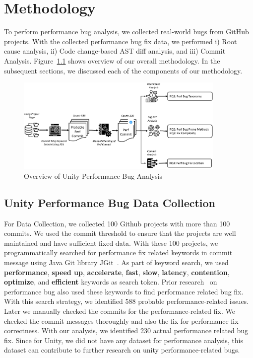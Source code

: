 \chapter{Methodology}
\label{chapter:methodology}
To perform \unity{} performance bug analysis, we collected real-world bugs from GitHub projects. With the collected performance bug fix data, we performed i) Root cause analysis, ii) Code change-based AST diff analysis, and iii) Commit Analysis. Figure~\ref{figure:overview} shows overview of our overall methodology. In the subsequent sections, we discussed each of the components of our methodology.


\begin{figure}[t]
	\centering
	\includegraphics[width=0.9\textwidth]{figure/overview.eps}
	\caption{Overview of Unity Performance Bug Analysis}
	\label{figure:overview}
\end{figure}

\section{Unity Performance Bug Data Collection}
\label{sec:datacollection}
For Data Collection, we collected 100 Github projects with more than 100 commits. We used the commit threshold to ensure that the projects are well maintained and have sufficient fixed data. With these 100 projects, we programmatically searched for performance fix related keywords in commit message using Java Git library JGit~\cite{JGit}. As part of keyword search, we used \textbf{performance}, \textbf{speed up}, \textbf{accelerate}, \textbf{fast}, \textbf{slow}, \textbf{latency}, \textbf{contention}, \textbf{optimize}, and \textbf{efficient} keywords as search token. Prior research~\cite{Chen:perf:19} on performance bug also used these keywords to find performance related bug fix. With this search strategy, we identified 588 probable performance-related issues. Later we manually checked the commits for the performance-related fix. We checked the commit messages thoroughly and also the fix for performance fix correctness. With our analysis, we identified 230 actual performance related bug fix. Since for Unity, we did not have any dataset for performance analysis, this dataset can contribute to further research on unity performance-related bugs.


